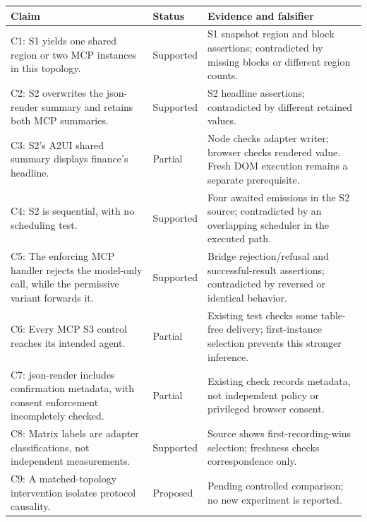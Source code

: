 \documentclass[11pt]{article}
\newcounter{none}
\begin{document}
{\def\LTcaptype{none} %
\begin{longtable}[]{@{}
  >{\raggedright\arraybackslash}p{0.3800\dimexpr\linewidth-4\tabcolsep\relax}
  >{\raggedright\arraybackslash}p{0.1400\dimexpr\linewidth-4\tabcolsep\relax}
  >{\raggedright\arraybackslash}p{0.4800\dimexpr\linewidth-4\tabcolsep\relax}@{}}
\toprule\noalign{}
\begin{minipage}[b]{\linewidth}\raggedright
Claim
\end{minipage} & \begin{minipage}[b]{\linewidth}\raggedright
Status
\end{minipage} & \begin{minipage}[b]{\linewidth}\raggedright
Evidence and falsifier
\end{minipage} \\
\midrule\noalign{}
\endhead
\bottomrule\noalign{}
\endlastfoot
C1: S1 yields one shared region or two MCP instances in this topology. &
Supported & S1 snapshot region and block assertions; contradicted by
missing blocks or different region counts. \\
C2: S2 overwrites the json-render summary and retains both MCP
summaries. & Supported & S2 headline assertions; contradicted by
different retained values. \\
C3: S2's A2UI shared summary displays finance's headline. & Partial &
Node checks adapter writer; browser checks rendered value. Fresh DOM
execution remains a separate prerequisite. \\
C4: S2 is sequential, with no scheduling test. & Supported & Four
awaited emissions in the S2 source; contradicted by an overlapping
scheduler in the executed path. \\
C5: The enforcing MCP handler rejects the model-only call, while the
permissive variant forwards it. & Supported & Bridge rejection/refusal
and successful-result assertions; contradicted by reversed or identical
behavior. \\
C6: Every MCP S3 control reaches its intended agent. & Partial &
Existing test checks some table-free delivery; first-instance selection
prevents this stronger inference. \\
C7: json-render includes confirmation metadata, with consent enforcement
incompletely checked. & Partial & Existing check records metadata, not
independent policy or privileged browser consent. \\
C8: Matrix labels are adapter classifications, not independent
measurements. & Supported & Source shows first-recording-wins selection;
freshness checks correspondence only. \\
C9: A matched-topology intervention isolates protocol causality. &
Proposed & Pending controlled comparison; no new experiment is
reported. \\
\end{longtable}
}
\end{document}
